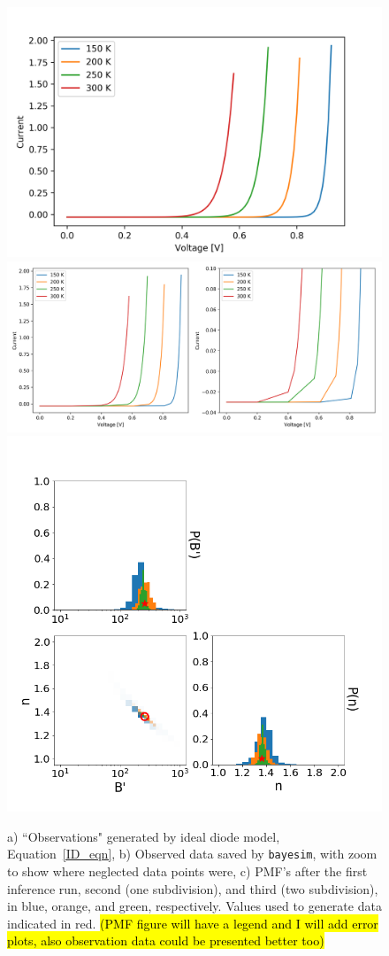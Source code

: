 \documentclass[aps,prl,amsmath,amssymb,superscriptaddress,notitlepage,groupedaddress]{revtex4-1}
\begin{document}
    \begin{figure}
      \includegraphics[width=0.33\columnwidth]{diode_obs.png}
      \includegraphics[width=0.45\columnwidth]{diode_obs_zoom.png}
      \includegraphics[width=0.8\columnwidth]{all_PMFs.png}
      \caption{a) ``Observations" generated by ideal diode model, Equation~\ref{ID_eqn}, b) Observed data saved by \texttt{bayesim}, with zoom to show where neglected data points were, c) PMF's after the first inference run, second (one subdivision), and third (two subdivision), in blue, orange, and green, respectively. Values used to generate data indicated in red. \hl{(PMF figure will have a legend and I will add error plots, also observation data could be presented better too)}}
      \label{ID_data}
    \end{figure}
\end{document}
